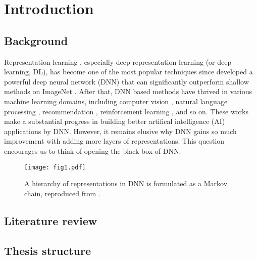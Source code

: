 

\chapter{Introduction}

\section{Background}
Representation learning \cite{bengio2013representation}, especially deep representation learning (or deep learning, DL), has become one of the most popular techniques since \citet{krizhevsky2012imagenet} developed a powerful deep neural network (DNN) that can significantly outperform shallow methods on ImageNet \cite{deng2009imagenet}. After that, DNN based methods have thrived in various machine learning domains, including computer vision \cite{simonyan2014very}, natural language processing \cite{kim-2014-convolutional}, recommendation \cite{cheng2016wide}, reinforcement learning \cite{silver2016mastering}, and so on. These works make a substantial progress in building better artifical intelligence (AI) applications by DNN. However, it remains elusive why DNN gains so much improvement with adding more layers of representations. This question encourages us to think of opening the black box of DNN.


\begin{figure}[t]
  \centering
  \texttt{[image: fig1.pdf]}
  \caption{A hierarchy of representations in DNN is formulated as a Markov chain, reproduced from .}
  \label{fig:hierarchy_dnn}
\end{figure}






\section{Literature review}
\lipsum[1]

\section{Thesis structure}
\lipsum[1]

